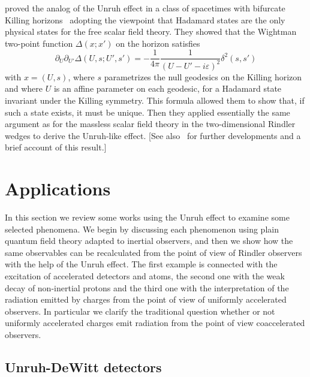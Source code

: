 \documentclass[12pt,nofootinbib,floatfix,aps,prd,showpacs,amsmath,amssymb,eqsecnum]{revtex4-2}
\let\cite\citep
\begin{document}
\textcite{Kayetal91} proved the analog of the Unruh effect in a class of
spacetimes with bifurcate Killing horizons~\cite{Boyer69} adopting the
viewpoint that 
Hadamard states are the only physical 
states for the free
scalar field theory.  They showed that the Wightman two-point function
$\Delta(x;x')$ on the horizon satisfies
\begin{equation}
\partial_{U}\partial_{U'}\Delta(U,s;U',s') = -
\frac{1}{4\pi}\frac{1}{(U-U'-i\varepsilon)^2}\delta^2(s,s')
\end{equation}
with $x=(U,s)$, where $s$ parametrizes 
the null geodesics on the Killing
horizon and where $U$ is an affine parameter on each geodesic, for a
Hadamard state invariant under the Killing symmetry.  This
formula allowed them to show that, if such a state exists, it must be
unique. Then they applied essentially the same argument as for the
massless scalar field theory in the two-dimensional Rindler wedges to
derive the Unruh-like effect. 
[See also~\textcite{Kay93,Kay01} for further
developments and a brief account of this result.]

\section{Applications}
\label{section:Applications}

In this section we review some works using
the Unruh effect to examine some 
selected phenomena. We begin by discussing
each phenomenon using plain quantum field theory adapted to inertial
observers, and then we show how the same observables can be recalculated
from the point of view of Rindler observers with the help of the 
Unruh effect. The first example is connected with the excitation of 
accelerated detectors and atoms, the second one with the weak decay of 
non-inertial protons and the third one with the interpretation of 
the radiation emitted by charges from the point of view of uniformly 
accelerated observers. In particular we clarify the traditional 
question whether or not uniformly accelerated charges emit radiation 
from the point of view coaccelerated observers. 

\subsection{Unruh-DeWitt detectors}
\label{subsection:detector}
\end{document}
